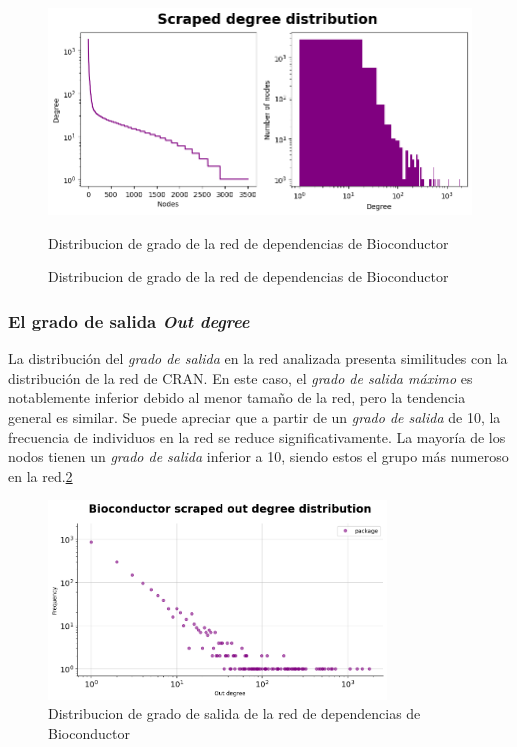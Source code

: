 \begin{figure}[h!]
    \begin{center}
        \includegraphics[width=1\textwidth]{img/bioconductor/degree_dist.png}
        \caption{Distribucion de grado de la red de dependencias de Bioconductor}
        \label{fig:bioconductor_degree_dist}
        \caption{Distribucion de grado de la red de dependencias de Bioconductor}
    \end{center}
\end{figure}

\subsubsection{El grado de salida \textit{Out degree}}

La distribución del \emph{grado de salida} en la red analizada presenta similitudes con
la distribución de la red de CRAN. En este caso, el \emph{grado de salida máximo} es
notablemente inferior debido al menor tamaño de la red, pero la tendencia general es
similar. Se puede apreciar que a partir de un \emph{grado de salida} de 10, la frecuencia
de individuos en la red se reduce significativamente. La mayoría de los nodos tienen un
\emph{grado de salida} inferior a 10, siendo estos el grupo más numeroso en la red.\ref{fig:bioconductor_out_degree_dist}

\begin{figure}[h!]
    \begin{center}
        \includegraphics[width=0.8\textwidth]{img/bioconductor/out_degree_dist.png}
        \caption{Distribucion de grado de salida de la red de dependencias de Bioconductor}
        \label{fig:bioconductor_out_degree_dist}
    \end{center}
\end{figure}

